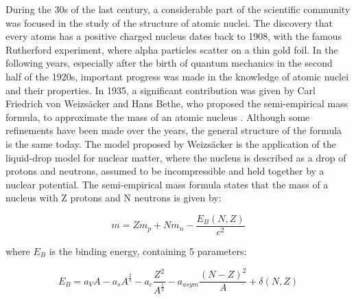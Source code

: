 
During the 30s of the last century, a considerable part of the scientific community was focused in the study of the structure of atomic nuclei. The discovery that every atoms has a positive charged nucleus dates back to 1908, with the famous Rutherford experiment, where alpha particles scatter on a thin gold foil. In the following years, especially after the birth of quantum mechanics in the second half of the 1920s, important progress was made in the knowledge of atomic nuclei and their properties. In 1935, a significant contribution was given by Carl Friedrich von Weizsäcker and Hans Bethe, who proposed the semi-empirical mass formula, to approximate the mass of an atomic nucleus \cite{Bethe:1936zz}. Although some refinements have been made over the years, the general structure of the formula is the same today. 
The model proposed by Weizsäcker is the application of the liquid-drop model for nuclear matter, where the nucleus is described as a drop of protons and neutrons, assumed to be incompressible and held together by a nuclear potential. The semi-empirical mass formula states that the mass of a nucleus with Z protons and N neutrons is given by: 

\begin{equation}
m = Zm_{p} + Nm_{n} - \frac{E_{B}(N,Z)}{c^{2}}
\end{equation}

where $E_{B}$ is the binding energy, containing 5 parameters:

\begin{equation}
E_{B} = a_{V}A -  a_{s}A^{\frac{2}{3}} - a_{c}\dfrac{Z^{2}}{A^{\frac{1}{3}}} -a_{asym}\dfrac{(N - Z)^{2}}{A} + \delta(N,Z)
\end{equation}

